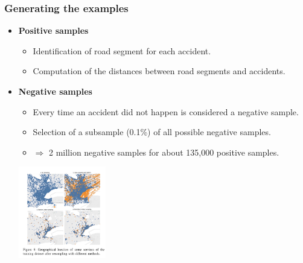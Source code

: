 \documentclass[slidestop,compress,red,mathserif]{beamer}
\newcommand{\colorcite}[1]{\colorlet{saved}{.}\color{sangria}\cite{#1}\color{saved}}
\begin{document}
\begin{frame}
	\frametitle{Generating the examples}
  \begin{itemize}
  \item[] \textbf{Positive samples}
    \begin{itemize}
      \item Identification of road segment for each accident.
      \item Computation of the distances between road segments and accidents.
    \end{itemize}
  \item[] \textbf{Negative samples}
    \begin{itemize}
      \item Every time an accident did not happen is considered a negative sample.
      \item Selection of a subsample (0.1\%) of all possible negative samples.
      \item $\Rightarrow$ 2 million negative samples for about 135,000 positive samples.
    \end{itemize}
    \centering
    \includegraphics[height=4cm]{Figures/imbalance-monika.png}
    \begin{tiny}
    \colorcite{sharma2018data}
    \end{tiny}
	\end{itemize}
\end{frame}
\end{document}
